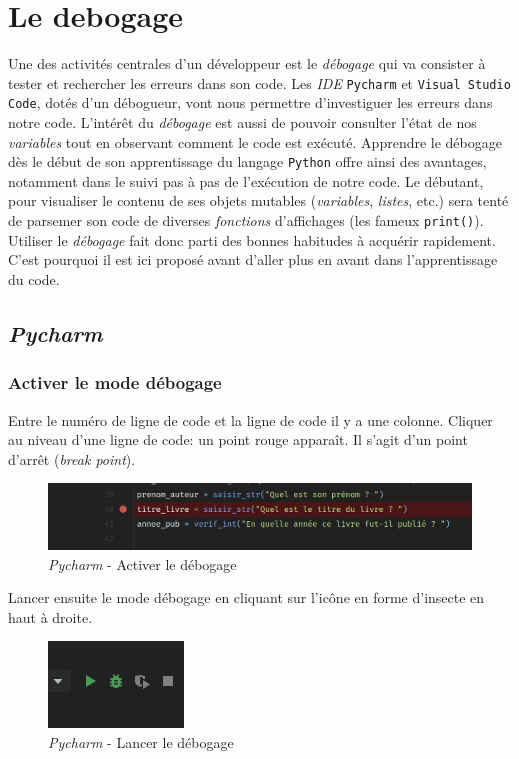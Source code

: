 \documentclass[a4paper,11pt]{book}
\begin{document}
\chapter{Le debogage}
Une des activités centrales d'un développeur est le \textit{débogage} qui va consister à tester et rechercher les erreurs dans son code. Les \textit{IDE} \texttt{Pycharm} et \texttt{Visual Studio Code}, dotés d'un débogueur, vont nous permettre d'investiguer les erreurs dans notre code. L'intérêt du \textit{débogage} est aussi de pouvoir consulter l'état de nos \textit{variables} tout en observant comment le code est exécuté. Apprendre le débogage dès le début de son apprentissage du langage \texttt{Python} offre ainsi des avantages, notamment dans le suivi pas à pas de l’exécution de notre code. Le débutant, pour visualiser le contenu de ses objets mutables (\textit{variables}, \textit{listes}, etc.) sera tenté de parsemer son code de diverses \textit{fonctions} d'affichages (les fameux \texttt{print()}). Utiliser le \textit{débogage} fait donc parti des bonnes habitudes à acquérir rapidement. C'est pourquoi il est ici proposé avant d'aller plus en avant dans l'apprentissage du code. 
\medskip

\section{\textit{Pycharm}}
\subsection*{Activer le mode débogage}
Entre le numéro de ligne de code et la ligne de code il y a une colonne. Cliquer au niveau d'une ligne de code: un point rouge apparaît. Il s'agit d'un point d'arrêt (\textit{break point}).
\begin{figure}[h]
\begin{center}
\includegraphics[scale=0.3]{IMG/Pycharm-05.png}
\caption{\textit{Pycharm} - Activer le débogage}
\end{center}
\end{figure}
\medskip

Lancer ensuite le mode débogage en cliquant sur l'icône en forme d'insecte en haut à droite.
\begin{figure}[h]
\begin{center}
\includegraphics[scale=0.6]{IMG/Pycharm-06.png}
\caption{\textit{Pycharm} - Lancer le débogage}
\end{center}
\end{figure}
\medskip
\end{document}
